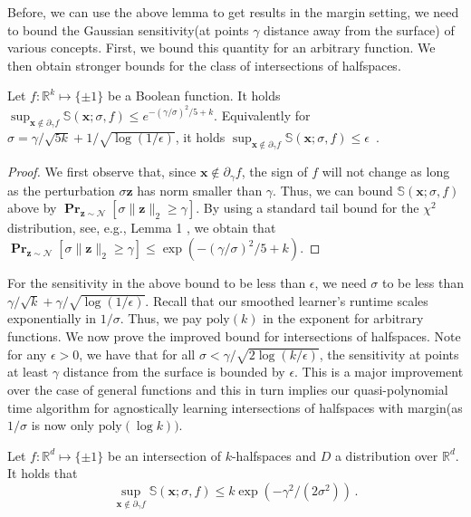 \documentclass{theoretics}
\renewcommand\vec[1]{\mathbf{#1}}
\DeclareMathOperator*{\pr}{\mathbf{Pr}}
\newcommand{\normal}{\mathcal{N}}
\newcommand{\R}{\mathbb{R}}
\newcommand{\eps}{\epsilon}
\newcommand{\poly}{\mathrm{poly}}
\newcommand{\1}{\Ind}
\newcommand{\x}{\vec x}
\newcommand{\z}{\vec z}
\begin{document}
Before, we can use the above lemma to get results in the margin setting, we need to bound the Gaussian sensitivity(at points $\gamma$ distance away from the surface) of various concepts. First, we bound this quantity for an arbitrary function. We then obtain stronger bounds for the class of intersections of halfspaces.

\begin{lemma}
\label{lemma:margin_general}
Let $f:\R^k \mapsto \{\pm 1\}$ be a Boolean function.  
It holds 
$\sup_{\x \notin \partial_\gamma f}\mathbb S(\x; \sigma, f) \leq 
e^{- (\gamma/\sigma)^2/5 + k} $.  Equivalently for $\sigma = \gamma/\sqrt{5 k} + 1/\sqrt{\log(1/\eps)} $, it holds  
$\sup_{\x \notin \partial_\gamma f}\mathbb S(\x; \sigma, f)  \leq \eps$ \,.
\end{lemma}
\begin{proof}
We first observe that, since $\x \notin \partial_\gamma f$, the sign of $f$ will not change
as long as the perturbation $\sigma \vec z$ has norm smaller than $\gamma$. Thus,  we can bound
$\mathbb S(\x;\sigma, f)$ above by $\pr_{\z \sim \normal}[\sigma \|\vec z\|_2 \geq \gamma]$.
By using a standard tail bound for the $\chi^2$ distribution, see, e.g., Lemma 1 \cite{laurent2000adaptive}, we obtain that
$\pr_{\z \sim \normal}[\sigma \|\vec z\|_2 \geq \gamma] 
\leq \exp(-(\gamma/\sigma)^2/5 + k) $.
\end{proof}
For the sensitivity in the above bound to be less than $\epsilon$, we need $\sigma$ to be less than $\gamma/\sqrt{k}+\gamma/\sqrt{\log(1/\epsilon)}$. Recall that our smoothed learner's runtime scales exponentially in $1/\sigma$. Thus, we pay $\poly(k)$ in the exponent for arbitrary functions.
We now prove the improved bound for intersections of halfspaces. Note for any $\epsilon>0$, we have that for all $\sigma< \gamma/\sqrt{2\log(k/\epsilon)}$, the sensitivity at points at least $\gamma$ distance from the surface is bounded by $\epsilon$. This is a major improvement over the case of general functions and this in turn implies our quasi-polynomial time algorithm for agnostically learning intersections of halfspaces with margin(as $1/\sigma$ is now only $\poly(\log k))$.
\begin{lemma} \label{proposition:margin-invariance}
Let $f:\R^d \mapsto \{\pm 1\}$ be an intersection of $k$-halfspaces
and $D$ a distribution over $\R^d$.  It holds that
\[
\sup_{\x \notin \partial_\gamma f} \mathbb S(\x; \sigma, f) \leq 
k \exp(- \gamma^2/(2 \sigma^2)) \,.
\]

\end{lemma}
\end{document}
